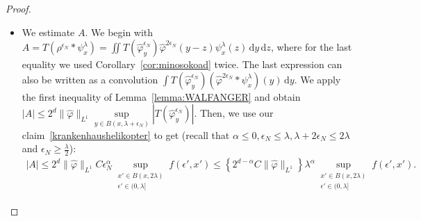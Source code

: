 \begin{proof}
  \begin{itemize}
    \item We estimate \( A \). We begin with \( A = T(\rho^{\epsilon_N} * \psi^\lambda_x) = \iint T(\hat \varphi^{\epsilon_N}_y) \hat \varphi^{2\epsilon_N}(y-z)\psi^\lambda_x(z) \, \mathrm{d}y \, \mathrm{d}z \), where for the last equality we used Corollary~\ref{cor:minosokoad} twice. The last expression can also be written as a convolution \( \int T(\hat \varphi^{\epsilon_N}_y) (\hat \varphi^{2\epsilon_N} * \psi^\lambda_x) (y) \, \mathrm{d}y \). We apply the first inequality of Lemma~\ref{lemma:WALFANGER} and obtain \( |A| \leq  2^d \lVert \hat \varphi \rVert_{L^1} \sup\limits_{y \in B(x, \lambda + \epsilon_N)}|T(\hat \varphi^{\epsilon_N}_y)| \). Then, we use our claim~\eqref{krankenhaushelikopter} to get (recall that \( \alpha \leq 0, \epsilon_N \leq \lambda, \lambda + 2\epsilon_N \leq 2 \lambda \) and \( \epsilon_N \geq \frac{\lambda}{2} \)):
    \begin{align*}
      |A| \leq 2^d \lVert \hat \varphi \rVert_{L^1}  C \epsilon_N^\alpha \sup_{\substack{x' \in B(x, 2\lambda)\\ \epsilon' \in (0, \lambda ] }} f(\epsilon', x') \leq \left\{ 2^{d - \alpha} C \lVert \hat \varphi \rVert_{L^1}\right \} \lambda^\alpha \sup_{\substack{x' \in B(x, 2\lambda)\\ \epsilon' \in (0, \lambda ] }} f(\epsilon', x').
    \end{align*}


\end{itemize}
\end{proof}
